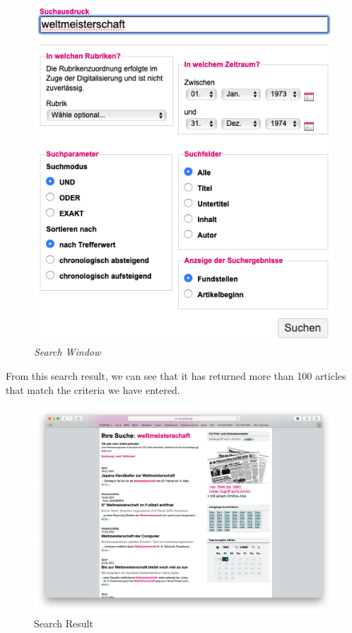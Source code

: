 \documentclass{article}
\begin{document}
\begin{figure}
    \centering
    \includegraphics[width=\textwidth]{nd_search.png}
    \caption{\textit{Search Window}}
    \label{fig:my_label}
\end{figure}

From this search result, we can see that it has returned more than 100 articles that match the criteria we have entered.

\begin{figure}
    \centering
    \includegraphics[width=\textwidth]{nd_searchresult.png}
    \caption{Search Result}
    \label{fig:my_label}
\end{figure}
\end{document}

